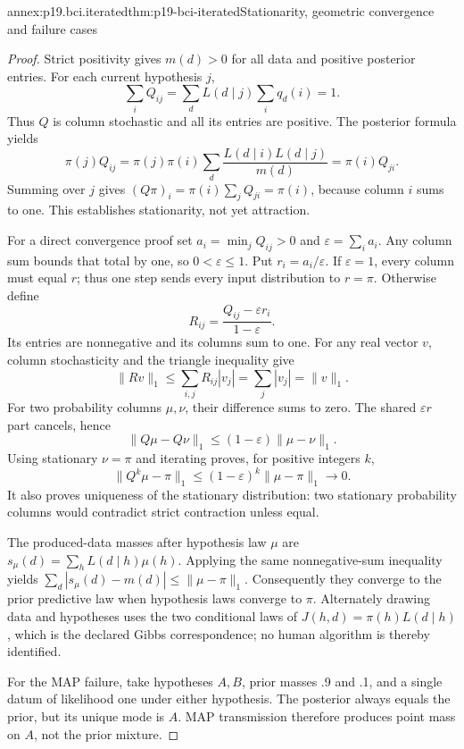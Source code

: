 \begin{annexitem}{annex:p19.bci.iterated}{thm:p19-bci-iterated}{Stationarity, geometric convergence and failure cases}
\begin{proof}
Strict positivity gives \(m(d)>0\) for all data and positive posterior
entries. For each current hypothesis \(j\),
\[
 \sum_iQ_{ij}=\sum_dL(d\mid j)\sum_iq_d(i)=1.
\]
Thus \(Q\) is column stochastic and all its entries are positive.
The posterior formula yields
\[
 \pi(j)Q_{ij}
 =\pi(j)\pi(i)\sum_d\frac{L(d\mid i)L(d\mid j)}{m(d)}
 =\pi(i)Q_{ji}.
\]
Summing over \(j\) gives
\((Q\pi)_i=\pi(i)\sum_jQ_{ji}=\pi(i)\), because column
\(i\) sums to one. This establishes stationarity, not yet attraction.

For a direct convergence proof set
\(a_i=\min_jQ_{ij}>0\) and
\(\varepsilon=\sum_i a_i\). Any column sum bounds that total
by one, so \(0<\varepsilon\leq1\). Put \(r_i=a_i/\varepsilon\).
If \(\varepsilon=1\), every column must equal \(r\); thus one
step sends every input distribution to \(r=\pi\).
Otherwise define
\[
 R_{ij}=\frac{Q_{ij}-\varepsilon r_i}{1-\varepsilon}.
\]
Its entries are nonnegative and its columns sum to one. For any real vector
\(v\), column stochasticity and the triangle inequality give
\[
 \lVert Rv\rVert_1
 \leq\sum_{i,j}R_{ij}|v_j|=\sum_j|v_j|=\lVert v\rVert_1.
\]
For two probability columns \(\mu,\nu\), their difference sums
to zero. The shared \(\varepsilon r\) part cancels, hence
\[
 \lVert Q\mu-Q\nu\rVert_1
 \leq(1-\varepsilon)\lVert\mu-\nu\rVert_1.
\]
Using stationary \(\nu=\pi\) and iterating proves, for positive integers \(k\),
\[
 \lVert Q^k\mu-\pi\rVert_1
 \leq(1-\varepsilon)^k\lVert\mu-\pi\rVert_1\longrightarrow0.
\]
It also proves uniqueness of the stationary distribution: two stationary
probability columns would contradict strict contraction unless equal.

The produced-data masses after hypothesis law \(\mu\) are
\(s_\mu(d)=\sum_hL(d\mid h)\mu(h)\). Applying the same
nonnegative-sum inequality yields
\(\sum_d|s_\mu(d)-m(d)|\leq\lVert\mu-\pi\rVert_1\).
Consequently they converge to the prior predictive law when hypothesis
laws converge to \(\pi\). Alternately drawing data and hypotheses
uses the two conditional laws of \(J(h,d)=\pi(h)L(d\mid h)\),
which is the declared Gibbs correspondence; no human algorithm is thereby
identified.

For the MAP failure, take hypotheses \(A,B\), prior masses .9 and .1,
and a single datum of likelihood one under either hypothesis. The posterior
always equals the prior, but its unique mode is \(A\). MAP transmission
therefore produces point mass on \(A\), not the prior mixture.


\end{proof}
\end{annexitem}

